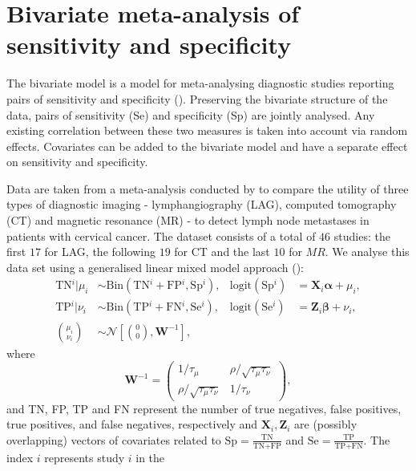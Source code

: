 \documentclass[a4paper,11pt]{article}
\def\mm#1{\ensuremath{\boldsymbol{#1}}} %
\begin{document}
\section*{Bivariate meta-analysis of sensitivity and specificity}

The bivariate model is a model for meta-analysing diagnostic studies
reporting pairs of sensitivity and specificity (\cite{Reitsma_etal_2005}).
Preserving the bivariate structure of the data, pairs of sensitivity
(Se) and specificity (Sp) are jointly analysed. Any existing
correlation between these two measures is taken into account via
random effects. Covariates can be added to the bivariate model and
have a separate effect on sensitivity and specificity.

 Data are taken from a meta-analysis conducted by \cite{Scheidler_etal_1997}
    to compare the utility of three types of diagnostic imaging -
    lymphangiography (LAG), computed tomography (CT) and magnetic
    resonance (MR) - to detect lymph node metastases in patients with
    cervical cancer. The dataset consists of a total of $46$ studies:
    the first $17$ for LAG, the following $19$ for CT and the last
    $10$ for $MR$. We analyse this data set using a generalised linear
    mixed model approach (\cite{Chu_Cole_2006}):
    \begin{align}
        \text{TN}{^i}|\mu_i &\sim \text{Bin}(\text{TN}{^i} +
        \text{FP}{^i}, \text{Sp}{^i}),&
        \text{logit}(\text{Sp}{^i}) &= \mm{X}_i \mm{\alpha} + \mu_i,\\
        \text{TP}{^i}|\nu_i &\sim \text{Bin}(\text{TP}{^i} +
        \text{FN}{^i}, \text{Se}{^i}),&
        \text{logit}(\text{Se}{^i}) &= \mm{Z}_i \mm{\beta} + \nu_i,\\[0.3cm]
        {\mu_i \choose \nu_i} &\sim \mathcal{N} \left[ {0 \choose 0}, \mathbf{W}^{-1}
        \right], \label{eq:biv}
    \end{align}
	where
	\begin{equation*}
	   \mathbf{W}^{-1} = \begin{pmatrix} 1/\tau_\mu & \rho/\sqrt{\tau_\mu \tau_\nu} \\
              \rho/\sqrt{\tau_\mu \tau_\nu} & 1/\tau_\nu
          \end{pmatrix},
	\end{equation*}
    and TN, FP, TP and FN represent the number of true negatives,
    false positives, true positives, and false negatives, respectively
    and $\mm{X}_i, \mm{Z}_i$ are (possibly overlapping) vectors of
    covariates related to $\text{Sp} = \tfrac{\text{TN}}{\text{TN} +
        \text{FP}}$ and $\text{Se} = \tfrac{\text{TP}}{\text{TP} +
        \text{FN}}$.  The index $i$ represents study $i$ in the
\end{document}
